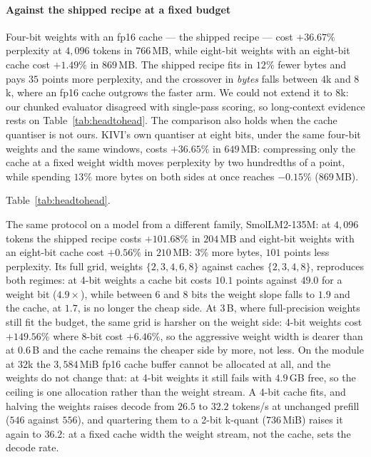 \documentclass[10pt,journal]{IEEEtran}
\begin{document}
\paragraph*{Against the shipped recipe at a fixed budget}
Four-bit weights with an fp16 cache --- the shipped recipe --- cost $+36.67\%$
perplexity at $4{,}096$ tokens in $766$\,MB, while eight-bit weights with an
eight-bit cache cost $+1.49\%$ in $869$\,MB. The shipped
recipe fits in $12\%$ fewer bytes and pays $35$ points more perplexity, and the
crossover in \emph{bytes} falls between $4$k and $8$k, where an fp16 cache
outgrows the faster arm. We could not extend it to $8$k: our chunked evaluator
disagreed with single-pass scoring, so long-context evidence rests on Table~\ref{tab:headtohead}.
The comparison also holds when the cache quantiser is not ours. KIVI's own quantiser at eight bits, under the same four-bit weights and the same windows, costs $+36.65\%$ in $649$\,MB: compressing only the cache at a fixed weight width moves perplexity by two hundredths of a point, while spending $13\%$ more bytes on both sides at once reaches $-0.15\%$ ($869$\,MB).

      Table~\ref{tab:headtohead}.

The same protocol on a model from a different family, SmolLM2-135M:
at $4{,}096$ tokens the shipped recipe costs $+101.68\%$ in $204$\,MB and
eight-bit weights with an eight-bit cache cost $+0.56\%$ in $210$\,MB: $3\%$
more bytes, $101$ points less perplexity. Its full grid, weights $\{2,3,4,6,8\}$ against caches $\{2,3,4,8\}$, reproduces
both regimes: at 4-bit weights a cache bit costs $10.1$ points against $49.0$ for
a weight bit ($4.9\times$), while between 6 and 8 bits the weight slope falls to
$1.9$ and the cache, at $1.7$, is no longer the cheap side. At 3\,B, where full-precision weights still fit the budget, the same
grid is harsher on the weight side: 4-bit weights cost $+149.56\%$ where
8-bit cost $+6.46\%$, so the aggressive weight width is dearer than at
$0.6$\,B and the cache remains the cheaper side by more, not less. On the module at $32$k the
$3{,}584$\,MiB fp16 cache buffer cannot be allocated at all, and the weights do
not change that: at 4-bit weights it still fails with $4.9$\,GB free, so the
ceiling is one allocation rather than the weight stream. A 4-bit cache fits, and
halving the weights raises decode from $26.5$ to $32.2$ tokens/s at
unchanged prefill ($546$ against $556$), and quartering them to a 2-bit
k-quant ($736$\,MiB) raises it again to $36.2$: at a fixed cache width the
weight stream, not the cache, sets the decode rate.
\end{document}
